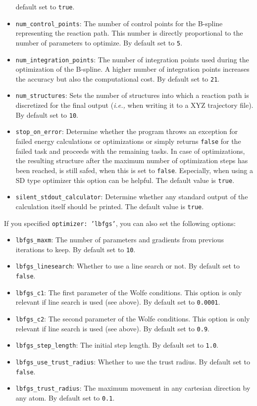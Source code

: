 \documentclass[]{tufte-book}
\begin{document}
\begin{itemize}
default set to \texttt{true}.
\item \texttt{num\_control\_points}: The number of control points for the B-spline representing the reaction path. This number
is directly proportional to the number of parameters to optimize. By default set to \texttt{5}.
\item \texttt{num\_integration\_points}: The number of integration points used during the optimization of the B-spline.
A higher number of integration points increases the accuracy but also the computational cost. By default set to \texttt{21}.
\item \texttt{num\_structures}: Sets the number of structures into which a reaction path is discretized for the final
output (\textit{i.e.,} when writing it to a XYZ trajectory file). By default set to \texttt{10}.
\item \texttt{stop\_on\_error}: Determine whether the program throws an exception for failed energy calculations or optimizations or simply returns \texttt{false} for the failed task and proceeds with the remaining tasks. In case of optimizations, the resulting structure after the maximum number of optimization steps has been reached, is still safed, when this is set to \texttt{false}. Especially, when using a SD type optimizer this option can be helpful. The default value is \texttt{true}.
\item \texttt{silent\_stdout\_calculator}: Determine whether any standard output of the calculation itself should be printed. The default value is \texttt{true}.
\end{itemize}

If you specified \texttt{optimizer: 'lbfgs'}, you can also set the following options:
\begin{itemize}
\item \texttt{lbfgs\_maxm}: The number of parameters and gradients from previous iterations to keep. By default set to
\texttt{10}.
\item \texttt{lbfgs\_linesearch}: Whether to use a line search or not. By default set to \texttt{false}.
\item \texttt{lbfgs\_c1}: The first parameter of the Wolfe conditions. This option is only relevant if line search is
used (see above). By default set to \texttt{0.0001}.
\item \texttt{lbfgs\_c2}:  The second parameter of the Wolfe conditions. This option is only relevant if line search is
used (see above). By default set to \texttt{0.9}.
\item \texttt{lbfgs\_step\_length}: The initial step length. By default set to \texttt{1.0}.
\item \texttt{lbfgs\_use\_trust\_radius}: Whether to use the trust radius. By default set to \texttt{false}.
\item \texttt{lbfgs\_trust\_radius}: The maximum movement in any cartesian direction by any atom. By default set to \texttt{0.1}.
\end{itemize}
\end{document}
